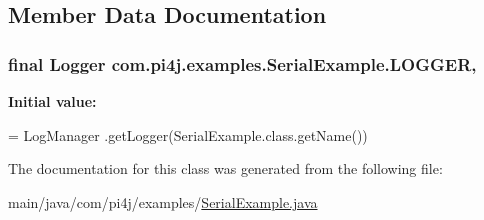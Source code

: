 \subsection{Member Data Documentation}
\hypertarget{classcom_1_1pi4j_1_1examples_1_1SerialExample_a21abb4ced3c96e7291e2c4cec4e9cb52}{}
\subsubsection[{L\+O\+G\+G\+E\+R}]{\setlength{\rightskip}{0pt plus 5cm}final Logger com.\+pi4j.\+examples.\+Serial\+Example.\+L\+O\+G\+G\+E\+R\hspace{0.3cm}{\ttfamily [static]}, {\ttfamily [private]}}\label{classcom_1_1pi4j_1_1examples_1_1SerialExample_a21abb4ced3c96e7291e2c4cec4e9cb52}
{\bfseries Initial value\+:}
\begin{DoxyCode}
= LogManager
            .getLogger(SerialExample.class.getName())
\end{DoxyCode}


The documentation for this class was generated from the following file\+:\begin{DoxyCompactItemize}
\item 
main/java/com/pi4j/examples/\hyperlink{SerialExample_8java}{Serial\+Example.\+java}\end{DoxyCompactItemize}
